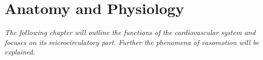 \chapter{Anatomy and Physiology}
\textit{The following chapter will outline the functions of the cardiovascular system and focuses on its microcirculatory part. Further the phenomena of vasomotion will be explained.}
